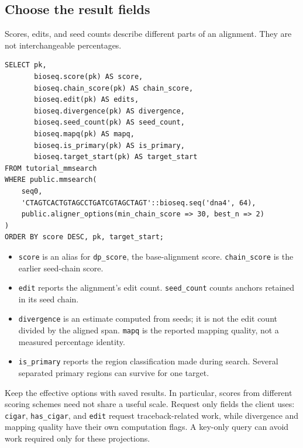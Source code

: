 \subsection{Choose the result fields}

Scores, edits, and seed counts describe different parts of an alignment.
They are not interchangeable percentages.

\par\noindent\begin{minipage}{\linewidth}
\begin{lstlisting}[style=bioseq-appendix-sql]
SELECT pk,
       bioseq.score(pk) AS score,
       bioseq.chain_score(pk) AS chain_score,
       bioseq.edit(pk) AS edits,
       bioseq.divergence(pk) AS divergence,
       bioseq.seed_count(pk) AS seed_count,
       bioseq.mapq(pk) AS mapq,
       bioseq.is_primary(pk) AS is_primary,
       bioseq.target_start(pk) AS target_start
FROM tutorial_mmsearch
WHERE public.mmsearch(
    seq0,
    'CTAGTCACTGTAGCCTGATCGTAGCTAGT'::bioseq.seq('dna4', 64),
    public.aligner_options(min_chain_score => 30, best_n => 2)
)
ORDER BY score DESC, pk, target_start;
\end{lstlisting}
\end{minipage}

\begin{itemize}
  \item \texttt{score} is an alias for \texttt{dp\_score}, the base-alignment
    score. \texttt{chain\_score} is the earlier seed-chain score.
  \item \texttt{edit} reports the alignment's edit count.
    \texttt{seed\_count} counts anchors retained in its seed chain.
  \item \texttt{divergence} is an estimate computed from seeds; it is not
    the edit count divided by the aligned span. \texttt{mapq} is the
    reported mapping quality, not a measured percentage identity.
  \item \texttt{is\_primary} reports the region classification made during
    search. Several separated primary regions can survive for one target.
\end{itemize}

Keep the effective options with saved results. In particular, scores from
different scoring schemes need not share a useful scale. Request only fields
the client uses: \texttt{cigar}, \texttt{has\_cigar}, and \texttt{edit} request
traceback-related work, while divergence and mapping quality have their own
computation flags. A key-only query can avoid work required only for these
projections.

